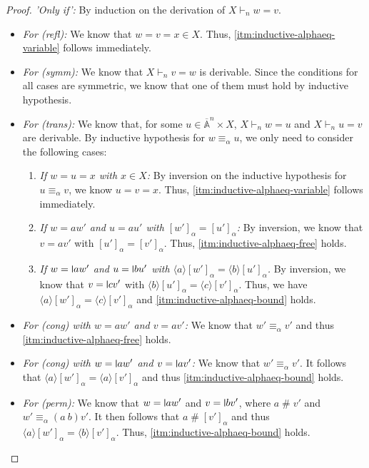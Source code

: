 \documentclass[a4paper,UKenglish,cleveref,thm-restate,numberwithinsect,final]{lipics-v2021}
\newcommand{\Names}{\mathbb{A}}
\newcommand{\barNames}{\overline{\Names}}
\newcommand{\alphaeq}{\equiv_\alpha}
\newcommand{\fresh}{\mathbin{\#}}
\newcommand{\bind}[1]{\langle #1\rangle}
\theoremstyle{plain}
\newcommand{\midmid}{\hspace{0.2ex}{\rule[-0.1ex]{0.6pt}{1.65ex}}\hspace{0.2ex}}
\newcommand{\newletter}[1]{{\midmid}#1}
\numberwithin{equation}{section}
\newcommand{\+}[1]{\mathcal{#1}\xspace}
\theoremstyle{definition}
\begin{document}
\begin{proof}
  \noindent\emph{'Only if':}
  By induction on the derivation of \(X \vdash_n w = v\).
  \begin{itemize}
    \item \emph{For (refl):}
      We know that \(w = v = x \in X\).
      Thus, \eqref{itm:inductive-alphaeq-variable} follows immediately.
    \item \emph{For (symm):}
      We know that \(X \vdash_n v = w\) is derivable.
      Since the conditions for all cases are symmetric, we know that one of them must hold by inductive hypothesis.
    \item \emph{For (trans):}
      We know that, for some \(u \in \barNames^n \times X\), \(X \vdash_n w = u\) and \(X \vdash_n u = v\) are derivable.
      By inductive hypothesis for \(w \alphaeq u\), we only need to consider the following cases:
      \begin{enumerate}
        \item
          \emph{If \(w = u = x\) with \(x \in X\):}
          By inversion on the inductive hypothesis for \(u \alphaeq v\), we know \(u = v = x\).
          Thus, \eqref{itm:inductive-alphaeq-variable} follows immediately.
        \item
          \emph{If \(w = aw'\) and \(u = au'\) with \([w']_\alpha = [u']_\alpha\):}
          By inversion, we know that \(v = av'\) with \([u']_\alpha = [v']_\alpha\).
          Thus, \eqref{itm:inductive-alphaeq-free} holds.
        \item
          \emph{If \(w = \newletter{a}w'\) and \(u = \newletter{b}u'\) with \(\bind{a}[w']_\alpha = \bind{b}[u']_\alpha\).}
          By inversion, we know that \(v = \newletter{c}v'\) with \(\bind{b}[u']_\alpha = \bind{c}[v']_\alpha\).
          Thus, we have \(\bind{a}[w']_\alpha = \bind{c}[v']_\alpha\) and \eqref{itm:inductive-alphaeq-bound} holds.
      \end{enumerate}
    \item
      \emph{For (cong) with \(w = aw'\) and \(v = av'\):}
      We know that \(w' \alphaeq v'\) and thus \eqref{itm:inductive-alphaeq-free} holds.
    \item
      \emph{For (cong) with \(w = \newletter{a}w'\) and \(v = \newletter{a}v'\):}
      We know that \(w' \alphaeq v'\).
      It follows that \(\bind{a}[w']_\alpha = \bind{a}[v']_\alpha\) and thus \eqref{itm:inductive-alphaeq-bound} holds.
    \item
      \emph{For (perm):}
      We know that \(w = \newletter{a}w'\) and \(v = \newletter{b}v'\), where \(a \fresh v'\) and \(w' \alphaeq (a\ b)v'\).
      It then follows that \(a \fresh [v']_\alpha\) and thus \(\bind{a}[w']_\alpha = \bind{b}[v']_\alpha\).
      Thus, \eqref{itm:inductive-alphaeq-bound} holds.
  \end{itemize}
\end{proof}
\end{document}
